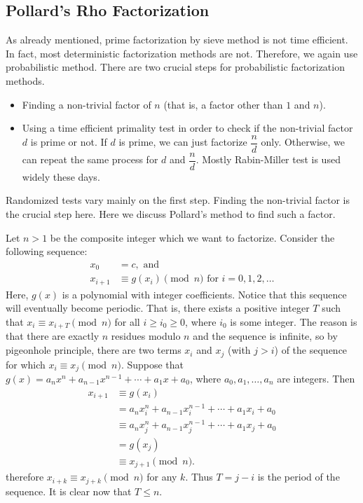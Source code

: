 \documentclass{subfiles}
\begin{document}
\subsection{Pollard's Rho Factorization}
	As already mentioned, prime factorization by sieve method is not time efficient. In fact, most deterministic factorization methods are not. Therefore, we again use probabilistic method. There are two crucial steps for probabilistic factorization methods.
		\begin{itemize}
			\item Finding a non-trivial factor of $n$ (that is, a factor other than $1$ and $n$).
			\item Using a time efficient primality test in order to check if the non-trivial factor $d$ is prime or not. If $d$ is prime, we can just factorize $\dfrac{n}{d}$ only. Otherwise, we can repeat the same process for $d$ and $\dfrac{n}{d}$. Mostly Rabin-Miller test is used widely these days.
		\end{itemize}
	Randomized tests vary mainly on the first step. Finding the non-trivial factor is the crucial step here. Here we discuss Pollard's method to find such a factor.
	
	Let $n>1$ be the composite integer which we want to factorize. Consider the following sequence:
		\begin{align*}
			x_0 &= c, \text{ and }\\
			x_{i+1} &\equiv g(x_i) \pmod n \text{ for } i=0, 1, 2, \ldots
		\end{align*}
	Here, $g(x)$ is a polynomial with integer coefficients. Notice that this sequence will eventually become periodic. That is, there exists a positive integer $T$ such that $x_i \equiv x_{i+T} \pmod n$ for all $i\geq i_0\geq 0$, where $i_0$ is some integer. The reason is that there are exactly $n$ residues modulo $n$ and the sequence is infinite, so by pigeonhole principle, there are two terms $x_i$ and $x_j$ (with $j>i$) of the sequence for which $x_i \equiv x_j \pmod n$. Suppose that $g(x)=a_nx^n+a_{n-1}x^{n-1} + \cdots + a_1x+a_0$, where $a_0, a_1, \ldots, a_n$ are integers. Then
		\begin{align*}
			x_{i+1} &\equiv g(x_i) \\
					&= a_nx_i^n+a_{n-1}x_i^{n-1} + \cdots + a_1x_i+a_0 \\
	 			    &\equiv a_nx_j^n+a_{n-1}x_j^{n-1} + \cdots + a_1x_j+a_0\\
					&= g(x_j) \\
					&\equiv x_{j+1} \pmod n.
		\end{align*}
	therefore $x_{i+k} \equiv x_{j+k} \pmod n $ for any $k$. Thus $T=j-i$ is the period of the sequence. It is clear now that $T \leq n$. 
	
\end{document}
